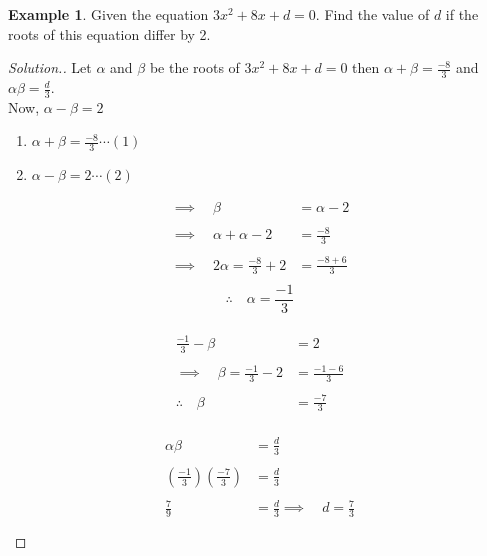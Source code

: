 \documentclass[11pt,a4paper]{article}
\theoremstyle{definition}
\newtheorem{example}[thm]{Example}
\newenvironment{solution}
  {\renewcommand{\qedsymbol}{}\begin{proof}[\textit{Solution}.]}
  {\end{proof}}
\begin{document}
\begin{example}

Given the equation $3x^2+8x+d=0$. Find the value of $d$ if the roots of this equation differ by 2.
\end{example}
\begin{solution}

Let $\alpha$ and $\beta$ be the roots of $3x^2+8x+d=0$ then $\alpha +\beta =\frac{-8}{3}$ and $\alpha \beta =\frac{d}{3}$.\\

Now, $\alpha - \beta = 2$
\begin{enumerate}
\item[] $\alpha +\beta=\frac{-8}{3}\cdots (1)$\\

\item[]$\alpha -\beta = 2\cdots (2)$\\
\end{enumerate}


\begin{align*}
\implies\quad  \beta & = \alpha -2\\\\
\implies \quad  \alpha+\alpha-2 & = \frac{-8}{3}\\\\
\implies \quad  2\alpha  = \frac{-8}{3}+2 & =\frac{-8+6}{3}\\
\end{align*}
$$\therefore \quad  \alpha=\frac{-1}{3}$$\\


\begin{align*}
\frac{-1}{3}-\beta &=2\\\\
\implies \quad  \beta =\frac{-1}{3}-2 & = \frac{-1-6}{3}\\\\
\therefore \quad  \beta &=\frac{-7}{3}\\ 
\end{align*}

\begin{align*}
\alpha \beta & = \frac{d}{3}\\\\
\left(\frac{-1}{3}\right)\left(\frac{-7}{3}\right) & = \frac{d}{3}\\\\
\frac{7}{9} & = \frac{d}{3}
\implies \quad  d=\frac{7}{3}\\\\
\end{align*}
\end{solution}
\end{document}
